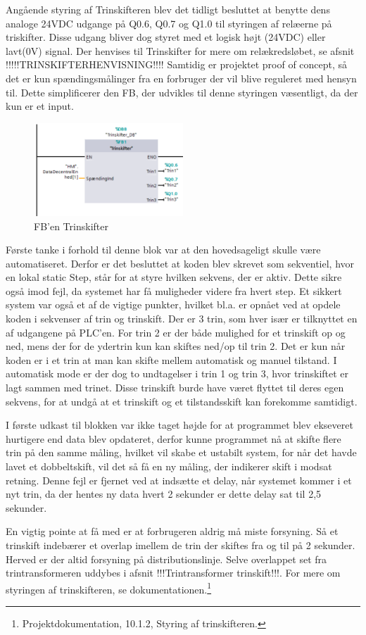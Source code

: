 Angående styring af Trinskifteren blev det tidligt besluttet at benytte dens analoge 24VDC udgange på Q0.6, Q0.7 og Q1.0 til styringen af relæerne på triskifter. Disse udgang bliver dog styret med et logisk højt (24VDC) eller lavt(0V) signal. Der henvises til Trinskifter for mere om relækredsløbet, se afsnit !!!!!TRINSKIFTERHENVISNING!!!! %
Samtidig er projektet proof of concept, så det er kun spændingsmålinger fra en forbruger der vil blive reguleret med hensyn til. Dette simplificerer den FB, der udvikles til denne styringen væsentligt, da der kun er et input.

\begin{figure}[H] %
	\centering
	\includegraphics[width=0.5\textwidth]{Figure/PLCTrinskifter}
	\caption{FB'en Trinskifter}
	\label{fig:PLCTrinskifter}
\end{figure}

Første tanke i forhold til denne blok var at den hovedsageligt skulle være automatiseret. Derfor er det besluttet at koden blev skrevet som sekventiel, hvor en lokal static Step, står for at styre hvilken sekvens, der er aktiv. Dette sikre også imod fejl, da systemet har få muligheder videre fra hvert step. Et sikkert system var også et af de vigtige punkter, hvilket bl.a. er opnået ved at opdele koden i sekvenser af trin og trinskift. Der er 3 trin, som hver især er tilknyttet en af udgangene på PLC'en. For trin 2 er der både mulighed for et trinskift op og ned, mens der for de ydertrin kun kan skiftes ned/op til trin 2. Det er kun når koden er i et trin at man kan skifte mellem automatisk og manuel tilstand. I automatisk mode er der dog to undtagelser i trin 1 og trin 3, hvor trinskiftet er lagt sammen med trinet. Disse trinskift burde have været flyttet til deres egen sekvens, for at undgå at et trinskift og et tilstandsskift kan forekomme samtidigt.


I første udkast til blokken var ikke taget højde for at programmet blev ekseveret hurtigere end data blev opdateret, derfor kunne programmet nå at skifte flere trin på den samme måling, hvilket vil skabe et ustabilt system, for når det havde lavet et dobbeltskift, vil det så få en ny måling, der indikerer skift i modsat retning. Denne fejl er fjernet ved at indsætte et delay, når systemet kommer i et nyt trin, da der hentes ny data hvert 2 sekunder er dette delay sat til 2,5 sekunder.


En vigtig pointe at få med er at forbrugeren aldrig må miste forsyning. Så et trinskift indebærer et overlap imellem de trin der skiftes fra og til på 2 sekunder. Herved er der altid forsyning på distributionslinje. Selve overlappet set fra trintransformeren uddybes i afsnit !!!Trintransformer trinskift!!!.
For mere om styringen af trinskifteren, se dokumentationen.\footnote{Projektdokumentation, 10.1.2, Styring af trinskifteren.}
